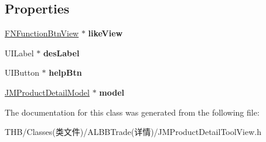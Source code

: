 \subsection*{Properties}
\begin{DoxyCompactItemize}
\item 
\mbox{\label{interface_j_m_product_detail_tool_view_a5582679c0721fa86214812c6344eef17}} 
\mbox{\hyperlink{interface_f_n_function_btn_view}{F\+N\+Function\+Btn\+View}} $\ast$ {\bfseries like\+View}
\item 
\mbox{\label{interface_j_m_product_detail_tool_view_a2af428b175933406dd8e719fb2e849f9}} 
U\+I\+Label $\ast$ {\bfseries des\+Label}
\item 
\mbox{\label{interface_j_m_product_detail_tool_view_a8d57f83d5f09060a890d87e099864b11}} 
U\+I\+Button $\ast$ {\bfseries help\+Btn}
\item 
\mbox{\label{interface_j_m_product_detail_tool_view_a0025d415a96fe799252f78a030002a9c}} 
\mbox{\hyperlink{interface_j_m_product_detail_model}{J\+M\+Product\+Detail\+Model}} $\ast$ {\bfseries model}
\end{DoxyCompactItemize}


The documentation for this class was generated from the following file\+:\begin{DoxyCompactItemize}
\item 
T\+H\+B/\+Classes(类文件)/\+A\+L\+B\+B\+Trade(详情)/J\+M\+Product\+Detail\+Tool\+View.\+h\end{DoxyCompactItemize}
